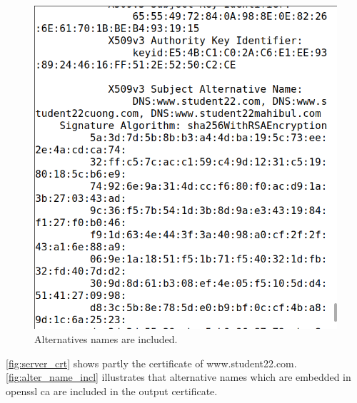 \begin{figure}
    \centering
    \includegraphics[height=\textheight,width=\textwidth,keepaspectratio]
    {figures/extension_server_crt.png}
    \caption{Alternatives names are included.}\label{fig:alter_name_incl}
\end{figure}

\autoref{fig:server_crt} shows partly the certificate of {\selectfont
www.student22.com}. \autoref{fig:alter_name_incl} illustrates that alternative
names which are embedded in {\selectfont openssl ca} are
included in the output certificate.